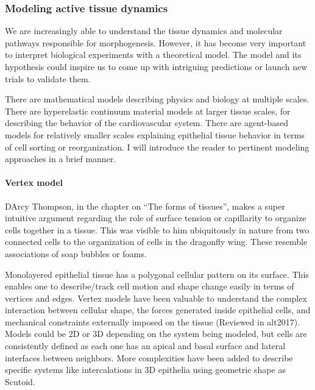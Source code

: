 \documentclass[
]{article}
\begin{document}
\hypertarget{modeling-active-tissue-dynamics}{%
\subsubsection{Modeling active tissue
dynamics}\label{modeling-active-tissue-dynamics}}

We are increasingly able to understand the tissue dynamics and molecular
pathways responsible for morphogenesis. However, it has become very
important to interpret biological experiments with a theoretical model.
The model and its hypothesis could inspire us to come up with intriguing
predictions or launch new trials to validate them.

There are mathematical models describing physics and biology at multiple
scales. There are hyperelastic continuum material models at larger
tissue scales, for describing the behavior of the cardiovascular system.
There are agent-based models for relatively smaller scales explaining
epithelial tissue behavior in terms of cell sorting or reorganization. I
will introduce the reader to pertinent modeling approaches in a brief
manner.

\hypertarget{vertex-model}{%
\paragraph{Vertex model}\label{vertex-model}}

D\textquotesingle Arcy Thompson, in the chapter on ``The forms of
tissues'', makes a super intuitive argument regarding the role of
surface tension or capillarity to organize cells together in a tissue.
This was visible to him ubiquitously in nature from two connected cells
to the organization of cells in the dragonfly wing. These resemble
associations of soap bubbles or foams.

Monolayered epithelial tissue has a polygonal cellular pattern on its
surface. This enables one to describe/track cell motion and shape change
easily in terms of vertices and edges. Vertex models have been valuable
to understand the complex interaction between cellular shape, the forces
generated inside epithelial cells, and mechanical constraints externally
imposed on the tissue (Reviewed in alt2017). Models could be 2D or 3D
depending on the system being modeled, but cells are consistently
defined as each one has an apical and basal surface and lateral
interfaces between neighbors. More complexities have been added to
describe specific systems like intercalations in 3D epithelia using
geometric shape as Scutoid.
\end{document}
